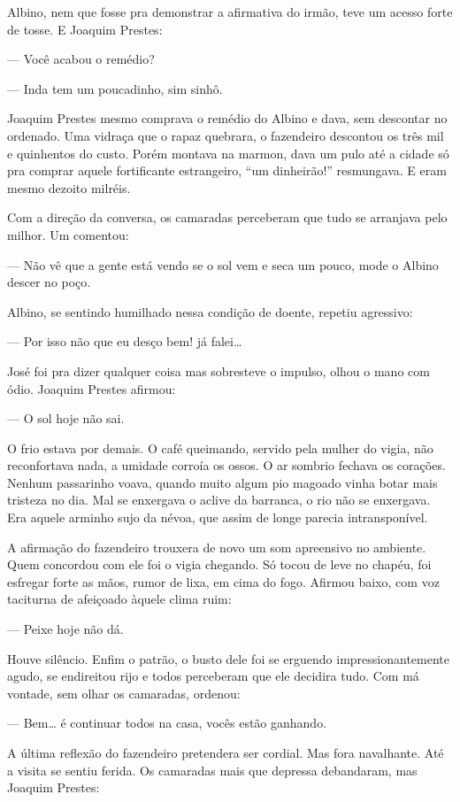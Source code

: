 Albino, nem que fosse pra demonstrar a afirmativa do irmão, teve um
acesso forte de tosse. E Joaquim Prestes:

--- Você acabou o remédio?

--- Inda tem um poucadinho, sim sinhô.

Joaquim Prestes mesmo comprava o remédio do Albino e dava, sem descontar
no ordenado. Uma vidraça que o rapaz quebrara, o fazendeiro descontou os
três mil e quinhentos do custo. Porém montava na marmon, dava um pulo
até a cidade só pra comprar aquele fortificante estrangeiro, ``um
dinheirão!'' resmungava. E eram mesmo dezoito milréis.

Com a direção da conversa, os camaradas perceberam que tudo se arranjava
pelo milhor. Um comentou:

--- Não vê que a gente está vendo se o sol vem e seca um pouco, mode o
Albino descer no poço.

Albino, se sentindo humilhado nessa condição de doente, repetiu
agressivo:

--- Por isso não que eu desço bem! já falei\ldots{}

José foi pra dizer qualquer coisa mas sobresteve o impulso, olhou o mano
com ódio. Joaquim Prestes afirmou:

--- O sol hoje não sai.

O frio estava por demais. O café queimando, servido pela mulher do
vigia, não reconfortava nada, a umidade corroía os ossos. O ar sombrio
fechava os corações. Nenhum passarinho voava, quando muito algum pio
magoado vinha botar mais tristeza no dia. Mal se enxergava o aclive da
barranca, o rio não se enxergava. Era aquele arminho sujo da névoa, que
assim de longe parecia intransponível.

A afirmação do fazendeiro trouxera de novo um som apreensivo no
ambiente. Quem concordou com ele foi o vigia chegando. Só tocou de leve
no chapéu, foi esfregar forte as mãos, rumor de lixa, em cima do fogo.
Afirmou baixo, com voz taciturna de afeiçoado àquele clima ruim:

--- Peixe hoje não dá.

Houve silêncio. Enfim o patrão, o busto dele foi se erguendo
impressionantemente agudo, se endireitou rijo e todos perceberam que ele
decidira tudo. Com má vontade, sem olhar os camaradas, ordenou:

--- Bem\ldots{} é continuar todos na casa, vocês estão ganhando.

A última reflexão do fazendeiro pretendera ser cordial. Mas fora
navalhante. Até a visita se sentiu ferida. Os camaradas mais que
depressa debandaram, mas Joaquim Prestes:

